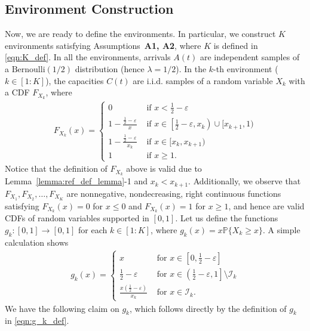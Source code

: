\documentclass[12pt,draftcls, onecolumn]{IEEEtran}
\begin{document}
\subsection{Environment Construction}
Now, we are ready to define the environments. In particular, we construct $K$ environments satisfying Assumptions~\textbf{A1, A2}, where $K$ is defined in \eqref{eqn:K_def}.  In all the environments, arrivals $A(t)$ are independent samples of a $\text{Bernoulli}(1/2)$ distribution (hence $\lambda = 1/2$). In the $k$-th  environment ($k \in [1:K]$), the capacities $C(t)$ are i.i.d. samples of a random variable $X_k$ with a CDF $F_{X_k}$, where
\begin{align}
    F_{X_k}(x) = \begin{cases}
        0 & \text{ if } x < \frac{1}{2} - \varepsilon\\
        1 - \frac{\frac{1}{2}-\varepsilon}{x} & \text{ if }x \in \left[\frac{1}{2} - \varepsilon ,x_k\right)\cup [x_{k+1},1)\\
         1 - \frac{\frac{1}{2}-\varepsilon}{x_k}& \text{ if }x \in [x_k,x_{k+1})\\
         1 & \text{ if } x \geq 1 \nonumber.
    \end{cases}
\end{align}
Notice that the definition of $F_{X_k}$ above is valid due to Lemma~\ref{lemma:ref_def_lemma}-1 and $x_k < x_{k+1}$. Additionally, we observe that $F_{X_1},F_{X_2},\dots,F_{X_K}$ are nonnegative, nondecreasing, right continuous functions satisfying $F_{X_k}(x) = 0$ for $x \leq 0$ and $F_{X_k}(x) = 1$ for $x \geq 1$, and hence are valid CDFs of random variables supported in $[0,1]$. Let us define the functions $g_k:[0,1] \to [0,1]$ for each $k \in [1:K]$, where $g_k(x) = x\mathbb{P}\{X_k \geq x \}$. A simple calculation shows
\begin{align}\label{eqn:g_k_def}
    g_k(x) = \begin{cases}
        x & \text{ for } x \in \left[0,\frac{1}{2}-\varepsilon\right]\\
        \frac{1}{2} - \varepsilon & \text{ for } x \in \left(\frac{1}{2} - \varepsilon , 1\right]\setminus \mathcal{I}_k\\
         \frac{x\left(\frac{1}{2}- \varepsilon\right)}{x_k} & \text{ for } x \in \mathcal{I}_k.
    \end{cases}
\end{align}
We have the following claim on $g_k$, which follows directly by the definition of $g_k$ in \eqref{eqn:g_k_def}.
\end{document}
